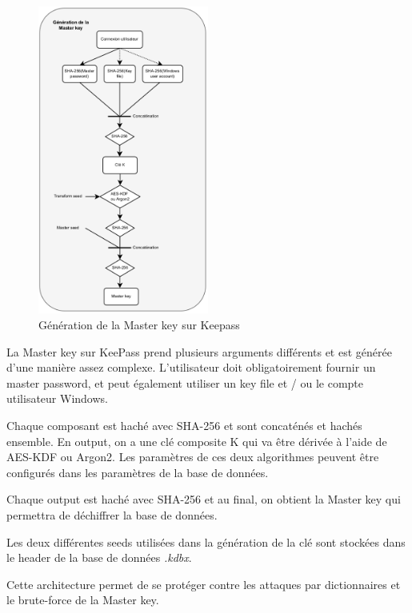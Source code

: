  \newpage

\begin{figure} 
	\includegraphics[width=0.5\textwidth]{images/keepass_generation_key.png}
	\caption{Génération de la Master key sur Keepass \label{schema_keepass}}
\end{figure}

La Master key sur KeePass prend plusieurs arguments différents et est générée d'une manière assez complexe. L'utilisateur doit obligatoirement fournir un master password, et peut également utiliser un key file et / ou le compte utilisateur Windows. 

Chaque composant est haché avec SHA-256 et sont concaténés et hachés ensemble. En output, on a une clé composite K qui va être dérivée à l'aide de AES-KDF ou Argon2. Les paramètres de ces deux algorithmes peuvent être configurés dans les paramètres de la base de données.

Chaque output est haché avec SHA-256 et au final, on obtient la Master key qui permettra de déchiffrer la base de données.

Les deux différentes seeds utilisées dans la génération de la clé sont stockées dans le header de la base de données \textit{.kdbx}.

Cette architecture permet de se protéger contre les attaques par dictionnaires et le brute-force de la Master key.
\newline\newline\newline\newline\newline
